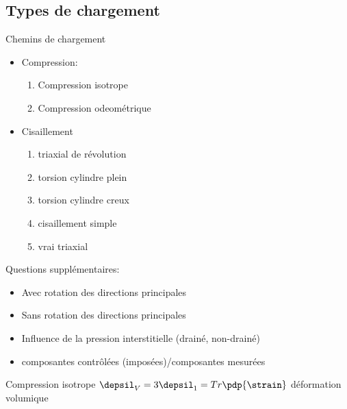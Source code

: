 \subsection{Types de chargement}
\label{subsec:types-chargement}

\begin{frame}{Chemins de chargement}
\begin{itemize}
\item Compression:
\begin{enumerate}
\item Compression isotrope \hyperlink{frame:comp-iso}{}
\item Compression odeométrique \hyperlink{frame:comp-oedo}{}
\end{enumerate}
\item Cisaillement
\begin{enumerate}
	\item triaxial de révolution \hyperlink{frame:triax-revo}{}
	\item torsion cylindre plein \hyperlink{frame:tors-pleine}{}
	\item torsion cylindre creux  \hyperlink{frame:tors-hollow}{} 
	\item cisaillement simple
	\item vrai triaxial
\end{enumerate}
\end{itemize}
Questions supplémentaires:
\begin{itemize}
	\item Avec rotation des directions principales
\item Sans rotation des directions principales
\item Influence de la pression interstitielle (drainé, non-drainé)
\item composantes contrôlées (imposées)/composantes mesurées
\end{itemize}
\end{frame}

\begin{frame}{\hypertarget{frame:comp-iso}{Compression isotrope}}
$\depsil_V=3\depsil_1=Tr\pdp{\strain}$ déformation volumique
\end{frame}

